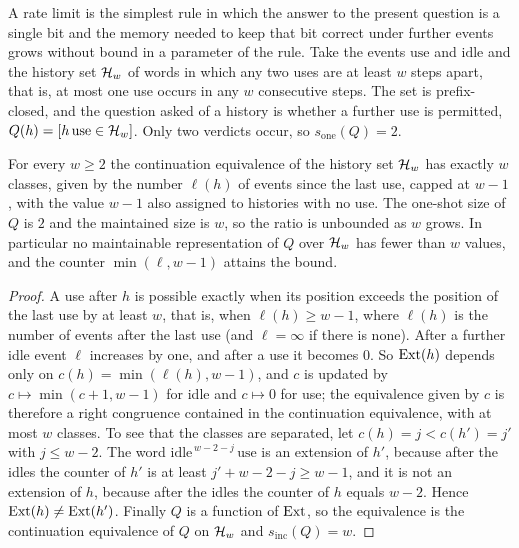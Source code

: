 A rate limit is the simplest rule in which the answer to the present question is a single bit and the memory needed to keep that bit correct under further events grows without bound in a parameter of the rule. Take the events $\mathrm{use}$ and $\mathrm{idle}$ and the history set $\mathcal{H}_w$ of words in which any two uses are at least $w$ steps apart, that is, at most one use occurs in any $w$ consecutive steps. The set is prefix-closed, and the question asked of a history is whether a further use is permitted, $Q(h)=[h\,\mathrm{use}\in\mathcal{H}_w]$. Only two verdicts occur, so $s_{\mathrm{one}}(Q)=2$.

\begin{newresult}\label{prop:rate-one}
For every $w\ge2$ the continuation equivalence of the history set $\mathcal{H}_w$ has exactly $w$ classes, given by the number $\ell(h)$ of events since the last use, capped at $w-1$, with the value $w-1$ also assigned to histories with no use. The one-shot size of $Q$ is $2$ and the maintained size is $w$, so the ratio is unbounded as $w$ grows. In particular no maintainable representation of $Q$ over $\mathcal{H}_w$ has fewer than $w$ values, and the counter $\min(\ell,w-1)$ attains the bound.
\end{newresult}
\begin{proof}
A use after $h$ is possible exactly when its position exceeds the position of the last use by at least $w$, that is, when $\ell(h)\ge w-1$, where $\ell(h)$ is the number of events after the last use (and $\ell=\infty$ if there is none). After a further idle event $\ell$ increases by one, and after a use it becomes $0$. So $\operatorname{Ext}(h)$ depends only on $c(h)=\min(\ell(h),w-1)$, and $c$ is updated by $c\mapsto\min(c+1,w-1)$ for idle and $c\mapsto0$ for use; the equivalence given by $c$ is therefore a right congruence contained in the continuation equivalence, with at most $w$ classes. To see that the classes are separated, let $c(h)=j<c(h')=j'$ with $j\le w-2$. The word $\mathrm{idle}^{\,w-2-j}\,\mathrm{use}$ is an extension of $h'$, because after the idles the counter of $h'$ is at least $j'+w-2-j\ge w-1$, and it is not an extension of $h$, because after the idles the counter of $h$ equals $w-2$. Hence $\operatorname{Ext}(h)\ne\operatorname{Ext}(h')$. Finally $Q$ is a function of $\operatorname{Ext}$, so the equivalence is the continuation equivalence of $Q$ on $\mathcal{H}_w$ and $s_{\mathrm{inc}}(Q)=w$.
\end{proof}

